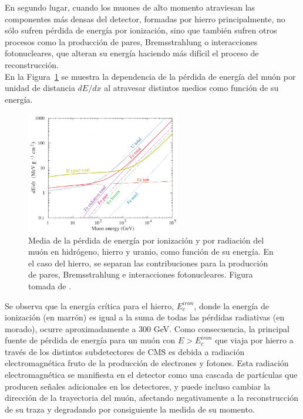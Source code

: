 En segundo lugar, cuando los muones de alto momento atraviesan las componentes m\'as densas del detector, formadas por hierro principalmente, no s\'olo sufren p\'erdida de energ\'ia por ionizaci\'on, sino que tambi\'en sufren otros procesos como la producci\'on de pares, Bremsstrahlung o interacciones fotonucleares, que alteran su energ\'ia haciendo m\'as dif\'icil el proceso de reconstrucci\'on. \\
En la Figura~\ref{fig:dEdX} se muestra la dependencia de la p\'erdida de energ\'ia del mu\'on por unidad de distancia $dE/dx$ al atravesar distintos medios como funci\'on de su energ\'ia. 

\begin{figure}[h]
\centering
\includegraphics[width=0.60\textwidth]{figures/dEdx.png}
\caption{Media de la p\'erdida de energ\'ia por ionizaci\'on y por radiaci\'on del mu\'on en hidr\'ogeno, hierro y uranio, como funci\'on de su energ\'ia. En el caso del hierro, se separan las contribuciones para la producci\'on de pares, Bremsstrahlung e interacciones fotonucleares. Figura tomada de \cite{Tanabashi:2018oca}.}
\label{fig:dEdX}        
\end{figure}

Se observa que la energ\'ia cr\'itica para el hierro, $E^{iron}_{c}$, donde la energ\'ia de ionizaci\'on (en marr\'on) es igual a la suma de todas las p\'erdidas radiativas (en morado), ocurre aproximadamente a 300 GeV. Como consecuencia, la principal fuente de p\'erdida de energ\'ia para un mu\'on con $E>E^{iron}_{c}$ que viaja por hierro a trav\'es de los distintos subdetectores de CMS es debida a radiaci\'on electromagn\'etica fruto de la producci\'on de electrones y fotones. Esta radiaci\'on electromagn\'etica se manifiesta en el detector como una cascada de part\'iculas que producen se\~nales adicionales en los detectores, y puede incluso cambiar la direcci\'on de la trayectoria del mu\'on, afectando negativamente a la reconstrucci\'on de su traza y degradando por consiguiente la medida de su momento. \\

